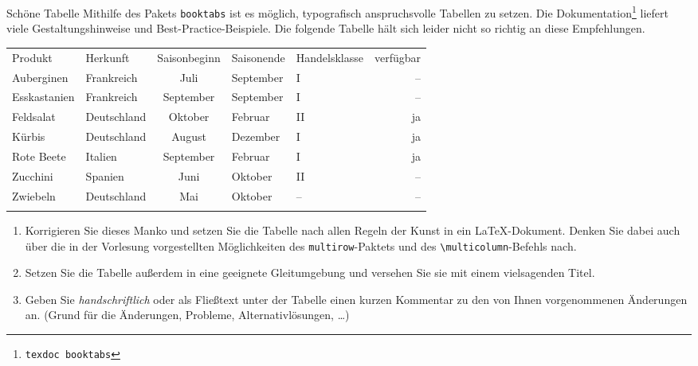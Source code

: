\documentclass[
	vorläufig=false, 
	blattnr=2,
	ausgabe=2022-10-19,
	abgabe=2022-11-02,
	lösung=true,
	shortverb=false,
]{../tex/latexkurs-exercise}
\begin{document}
\begin{aufgabe}[6]{Schöne Tabelle}
	Mithilfe des Pakets \verb|booktabs| ist es möglich, typografisch anspruchsvolle Tabellen zu setzen. Die Dokumentation\footnote{\texttt{texdoc booktabs}} liefert viele Gestaltungshinweise und Best-Practice-Beispiele. Die folgende Tabelle hält sich leider nicht so richtig an diese Empfehlungen.

	\noindent
	\begin{minipage}{\textwidth}
		\centering
		\begin{tabular}{|p{2.1cm}||p{2.5cm}|cl|lr|}
			\hhline{=-----}
			Produkt & Herkunft & Saisonbeginn & Saisonende & Handelsklasse & verfügbar\\\hhline{======}
			Auberginen & Frankreich & Juli & September & I & – \\\hline
			Esskastanien & Frankreich & September & September & I & – \\\hline
			Feldsalat & Deutschland & Oktober & Februar & II & ja \\\hline
			Kürbis & Deutschland & August & Dezember & I & ja\\\hline
			Rote Beete & Italien & September & Februar & I  & ja\\\hline
			Zucchini & Spanien & Juni & Oktober & II &  –\\\hline
			Zwiebeln & Deutschland & Mai & Oktober & – & –\\\hhline{======}
		\end{tabular}
	\end{minipage}
	
	\begin{enumerate}[label=\alph*)]
		\item Korrigieren Sie dieses Manko und setzen Sie die Tabelle nach allen Regeln der Kunst in ein \LaTeX-Dokument. Denken Sie dabei auch über die in der Vorlesung vorgestellten Möglichkeiten des \verb|multirow|-Paktets und des \texttt{\textbackslash multicolumn}-Befehls nach.
		\item Setzen Sie die Tabelle außerdem in eine geeignete Gleitumgebung und versehen Sie sie mit einem vielsagenden Titel.
		\item Geben Sie \emph{handschriftlich} oder als Fließtext unter der Tabelle einen kurzen Kommentar zu den von Ihnen vorgenommenen Änderungen an. (Grund für die Änderungen, Probleme, Alternativlösungen, …)
	\end{enumerate}
\end{aufgabe}
\end{document}
